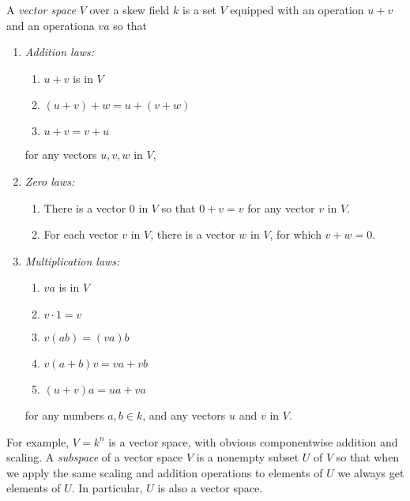 A \emph{vector space} \(V\) over a skew field \(k\) is a set \(V\) equipped with an operation \(u+v\) and an operationa \(va\) so that
\begin{enumerate}
\item[]\emph{Addition laws:}
    \begin{enumerate}
        \item $u+v$ is in $V$
        \item $(u+v)+w=u+(v+w)$
        \item $u+v=v+u$
    \end{enumerate}
    for any vectors $u,v,w$ in $V$,
    \item[] \emph{Zero laws:}
    \begin{enumerate}
        \item There is a vector $0$ in $V$ so that $0+v=v$ for any vector $v$ in $V$.
        \item For each vector $v$ in $V$, there is a vector $w$ in $V$, for which $v+w=0$.
    \end{enumerate}
    \item[]\emph{Multiplication laws:}
    \begin{enumerate}
        \item $va$ is in $V$
        \item $v \cdot 1 = v$
        \item $v(ab)=(va)b$
        \item $v(a+b)v=va+vb$
        \item $(u+v)a=ua+va$
    \end{enumerate}
    for any numbers $a, b \in k$, and any vectors $u$ and $v$ in $V$.
\end{enumerate}
For example, \(V=k^n\) is a vector space, with obvious componentwise addition and scaling.
A \emph{subspace} of a vector space \(V\) is a nonempty subset \(U\) of \(V\) so that when we apply the same scaling and addition operations to elements of \(U\) we always get elements of \(U\).
In particular, \(U\) is also a vector space.

